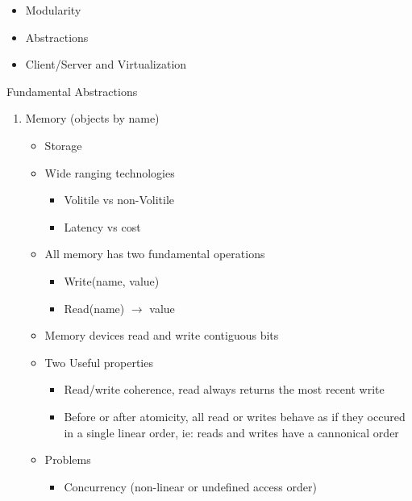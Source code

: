 \documentclass{report}
\begin{document}
\begin{description}
\begin{itemize}
\begin{itemize}
                    \item Modularity
                    \item Abstractions
                    \item Client/Server and Virtualization
                \end{itemize}
        \end{itemize}
    \item Fundamental Abstractions
        \begin{enumerate}
            \item Memory (objects by name)
                \begin{itemize}
                    \item Storage
                    \item Wide ranging technologies
                        \begin{itemize}
                            \item Volitile vs non-Volitile
                            \item Latency vs cost
                        \end{itemize}
                    \item All memory has two fundamental operations
                        \begin{itemize}
                            \item Write(name, value)
                            \item Read(name) $\to$ value
                        \end{itemize}
                    \item Memory devices read and write contiguous bits
                    \item Two Useful properties
                        \begin{itemize}
                            \item Read/write coherence, read always returns the most recent write
                            \item Before or after atomicity, all read or writes behave as if they
                                occured in a single linear order, ie: reads and writes have a cannonical
                                order
                        \end{itemize}
                    \item Problems
                        \begin{itemize}
                            \item Concurrency (non-linear or undefined access order)

\end{itemize}
\end{itemize}
\end{enumerate}
\end{description}
\end{document}
